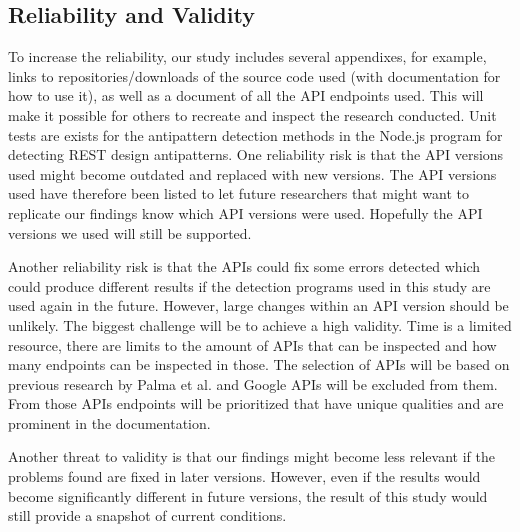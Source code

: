 \clearpage

\subsection{Reliability and Validity} \label{Reliability and Validity}

To increase the reliability, our study includes several appendixes, for example, links to repositories/downloads of the source code used (with documentation for how to use it), as well as a document of all the API endpoints used. This will make it possible for others to recreate and inspect the research conducted. Unit tests are exists for the antipattern detection methods in the Node.js program for detecting REST design antipatterns. 
One reliability risk is that the API versions used might become outdated and replaced with new versions. The API versions used have therefore been listed to let future researchers that might want to replicate our findings know which API versions were used. Hopefully the API versions we used will still be supported.

Another reliability risk is that the APIs could fix some errors detected which could produce different results if the detection programs used in this study are used again in the future. However, large changes within an API version should be unlikely. 
The biggest challenge will be to achieve a high validity. Time is a limited resource, there are limits to the amount of APIs that can be inspected and how many endpoints can be inspected in those. The  selection of APIs will be based on previous research by Palma et al. \cite{linguistic} and Google APIs will be excluded from them. From those APIs endpoints will be prioritized that have unique qualities and are prominent in the documentation. 

Another threat to validity is that our findings might become less relevant if the problems found are fixed in later versions. However, even if the results would become significantly different in future versions, the result of this study would still provide a snapshot of current conditions. 

\clearpage
\newpage